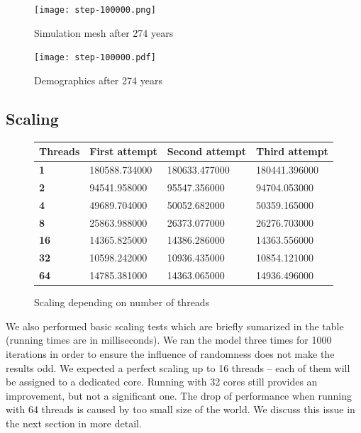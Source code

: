 \documentclass[a4paper]{article}
\begin{document}
\begin{figure}[pht]
    \centering
    \texttt{[image: step-100000.png]}
    \caption{Simulation mesh after 274 years}
    \texttt{[image: step-100000.pdf]}
    \caption{Demographics after 274 years}
\end{figure}

\subsection{Scaling}

\begin{figure}[ht]
    \centering
    \begin{tabu} {| X[0.8,c,p] || X[1,c,p] | X[1,c,p] | X[1,c,p] |}
        \rowfont{\bfseries}
        \hline
        Threads &
        First attempt &
        Second attempt&
        Third attempt \\
        \hline
        \hline
        \textbf{1} & 180588.734000 & 180633.477000 & 180441.396000 \\
        \hline
        \textbf{2} & 94541.958000 & 95547.356000 & 94704.053000 \\
        \hline
        \textbf{4} & 49689.704000 & 50052.682000 & 50359.165000 \\
        \hline
        \textbf{8} & 25863.988000 & 26373.077000 & 26276.703000 \\
        \hline
        \textbf{16} & 14365.825000 & 14386.286000 & 14363.556000 \\
        \hline
        \textbf{32} & 10598.242000 & 10936.435000 & 10854.121000 \\
        \hline
        \textbf{64} & 14785.381000 & 14363.065000 & 14936.496000 \\
        \hline
    \end{tabu}
    \caption{Scaling depending on number of threads}
\end{figure}

We also performed basic scaling tests which are briefly sumarized in the table (running times are in milliseconds).
We ran the model three times for 1000 iterations in order to ensure the influence of randomness does not make the results odd.
We expected a perfect scaling up to 16 threads -- each of them will be assigned to a dedicated core.
Running with 32 cores still provides an improvement, but not a significant one.
The drop of performance when running with 64 threads is caused by too small size of the world.
We discuss this issue in the next section in more detail.
\end{document}
